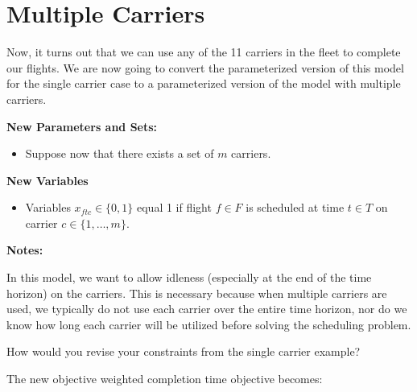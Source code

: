 \documentclass[11pt]{article}
\theoremstyle{definition}
\begin{document}
\newpage
\section{Multiple Carriers}

Now, it turns out that we can use any of the 11 carriers in the fleet to complete our flights. We are now going to convert the parameterized version of this model for the single carrier case to a parameterized version of the model with multiple carriers.

\textbf{New Parameters and Sets:}
\begin{itemize}
    \item Suppose now that there exists a set of $m$ carriers. 
\end{itemize}

\textbf{New Variables}
\begin{itemize}
    \item Variables $x_{ftc} \in \{0,1\}$ equal 1 if flight $f \in F$ is scheduled at time $t \in T$ on carrier $c \in \{1,\ldots,m\}$.
\end{itemize}  

\textbf{Notes:}

In this model, we want to allow idleness (especially at the end of the time horizon) on the carriers. This is necessary because when multiple carriers are used, we typically do not use each carrier over the entire time horizon, nor do we know how long each carrier will be utilized before solving the scheduling problem.

How would you revise your constraints from the single carrier example?

\vfill




The new objective weighted completion time objective becomes:
\vskip 4cm
\newpage
\end{document}
